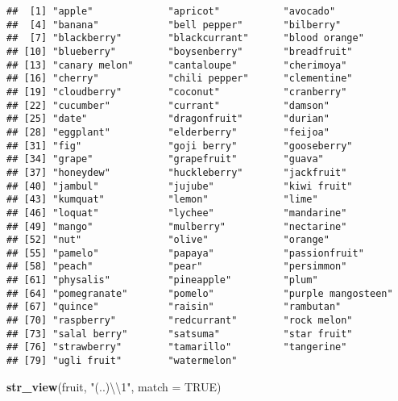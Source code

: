 \documentclass[
]{article}
\newenvironment{Shaded}{\begin{snugshade}}{\end{snugshade}}
\newcommand{\CharTok}[1]{\textcolor[rgb]{0.31,0.60,0.02}{#1}}
\newcommand{\DataTypeTok}[1]{\textcolor[rgb]{0.13,0.29,0.53}{#1}}
\newcommand{\KeywordTok}[1]{\textcolor[rgb]{0.13,0.29,0.53}{\textbf{#1}}}
\newcommand{\NormalTok}[1]{#1}
\newcommand{\OtherTok}[1]{\textcolor[rgb]{0.56,0.35,0.01}{#1}}
\newcommand{\StringTok}[1]{\textcolor[rgb]{0.31,0.60,0.02}{#1}}
\begin{document}
\begin{verbatim}
##  [1] "apple"             "apricot"           "avocado"          
##  [4] "banana"            "bell pepper"       "bilberry"         
##  [7] "blackberry"        "blackcurrant"      "blood orange"     
## [10] "blueberry"         "boysenberry"       "breadfruit"       
## [13] "canary melon"      "cantaloupe"        "cherimoya"        
## [16] "cherry"            "chili pepper"      "clementine"       
## [19] "cloudberry"        "coconut"           "cranberry"        
## [22] "cucumber"          "currant"           "damson"           
## [25] "date"              "dragonfruit"       "durian"           
## [28] "eggplant"          "elderberry"        "feijoa"           
## [31] "fig"               "goji berry"        "gooseberry"       
## [34] "grape"             "grapefruit"        "guava"            
## [37] "honeydew"          "huckleberry"       "jackfruit"        
## [40] "jambul"            "jujube"            "kiwi fruit"       
## [43] "kumquat"           "lemon"             "lime"             
## [46] "loquat"            "lychee"            "mandarine"        
## [49] "mango"             "mulberry"          "nectarine"        
## [52] "nut"               "olive"             "orange"           
## [55] "pamelo"            "papaya"            "passionfruit"     
## [58] "peach"             "pear"              "persimmon"        
## [61] "physalis"          "pineapple"         "plum"             
## [64] "pomegranate"       "pomelo"            "purple mangosteen"
## [67] "quince"            "raisin"            "rambutan"         
## [70] "raspberry"         "redcurrant"        "rock melon"       
## [73] "salal berry"       "satsuma"           "star fruit"       
## [76] "strawberry"        "tamarillo"         "tangerine"        
## [79] "ugli fruit"        "watermelon"
\end{verbatim}

\begin{Shaded}
\begin{Highlighting}[]
\KeywordTok{str\_view}\NormalTok{(fruit, }\StringTok{"(..)}\CharTok{\textbackslash{}\textbackslash{}}\StringTok{1"}\NormalTok{, }\DataTypeTok{match =} \OtherTok{TRUE}\NormalTok{)}
\end{Highlighting}
\end{Shaded}

\hypertarget{htmlwidget-670da3316a98bc338743}{}
\begin{str_view}

\end{str_view}
\end{document}
